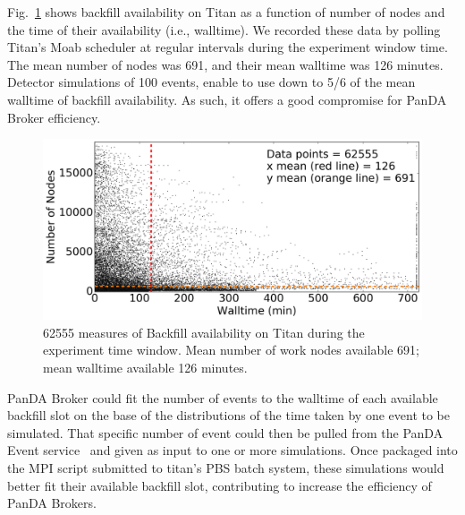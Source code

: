 Fig.~\ref{fig:backfill-distrib} shows backfill availability on Titan as a
function of number of nodes and the time of their availability (i.e.,
walltime). We recorded these data by polling Titan's Moab scheduler at
regular intervals during the experiment window time. The mean number of nodes
was 691, and their mean walltime was 126 minutes. Detector simulations of 100
events, enable to use down to 5/6 of the mean walltime of backfill
availability. As such, it offers a good compromise for PanDA Broker
efficiency.

\begin{figure}[!t]
    \includegraphics[clip,width=\columnwidth]{figures/titan_backfill_avail.png}
   \vspace{-0.1in}
    \caption{
    62555 measures of Backfill availability on Titan during the experiment
    time window. Mean number of work nodes available 691; mean walltime
    available 126 minutes.}
\label{fig:backfill-distrib}
\end{figure}

PanDA Broker could fit the number of events to the walltime of each available
backfill slot on the base of the distributions of the time taken by one event
to be simulated. That specific number of event could then be pulled from the
PanDA Event service~\cite{calafiura2015atlas} and given as input to one or
more simulations. Once packaged into the MPI script submitted to titan's PBS
batch system, these simulations would better fit their available backfill
slot, contributing to increase the efficiency of PanDA Brokers.


